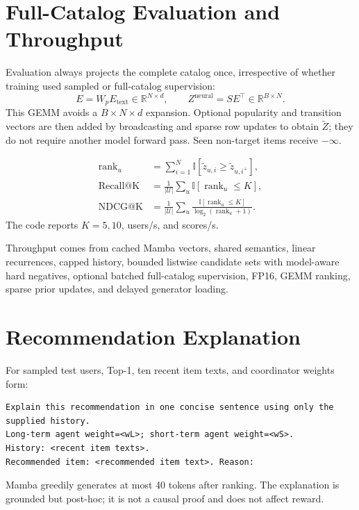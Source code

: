 \documentclass[11pt,a4paper]{article}
\newcommand{\R}{\mathbb{R}}
\begin{document}
\section{Full-Catalog Evaluation and Throughput}

Evaluation always projects the complete catalog once, irrespective of whether
training used sampled or full-catalog supervision:
\begin{equation}
  E=W_pE_{\mathrm{text}}\in\R^{N\times d},
  \qquad Z^{\mathrm{neural}}=SE^\top\in\R^{B\times N}.
\end{equation}
This GEMM avoids a $B\times N\times d$ expansion. Optional popularity and
transition vectors are then added by broadcasting and sparse row updates to
obtain $\widetilde Z$; they do not require another model forward pass. Seen
non-target items receive $-\infty$.

\begin{align}
  \operatorname{rank}_u
  &=\sum_{i=1}^N\mathbb{I}[\widetilde z_{u,i}\geq
    \widetilde z_{u,i^+}],\\
  \operatorname{Recall@K}
  &=\frac1{|\mathcal U|}\sum_u\mathbb{I}[\operatorname{rank}_u\leq K],\\
  \operatorname{NDCG@K}
  &=\frac1{|\mathcal U|}\sum_u
  \frac{\mathbb{I}[\operatorname{rank}_u\leq K]}
       {\log_2(\operatorname{rank}_u+1)}.
\end{align}
The code reports $K=5,10$, users/s, and scores/s.

Throughput comes from cached Mamba vectors, shared semantics, linear
recurrences, capped history, bounded listwise candidate sets with model-aware
hard negatives, optional batched full-catalog supervision, FP16, GEMM ranking,
sparse prior updates, and delayed generator loading.

\section{Recommendation Explanation}

For sampled test users, Top-1, ten recent item texts, and coordinator weights form:
\begin{lstlisting}[language={}]
Explain this recommendation in one concise sentence using only the supplied history.
Long-term agent weight=<wL>; short-term agent weight=<wS>.
History: <recent item texts>.
Recommended item: <recommended item text>. Reason:
\end{lstlisting}
Mamba greedily generates at most 40 tokens after ranking. The explanation is grounded but post-hoc; it is not a causal proof and does not affect reward.
\end{document}
